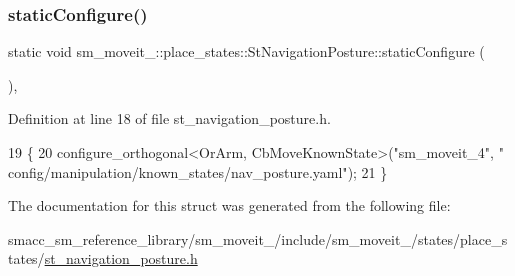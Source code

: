 \subsubsection{\texorpdfstring{static\+Configure()}{staticConfigure()}}
{\footnotesize\ttfamily static void sm\+\_\+moveit\+\_\+::place\+\_\+states\+::\+St\+Navigation\+Posture\+::static\+Configure (\begin{DoxyParamCaption}{ }\end{DoxyParamCaption})\hspace{0.3cm}{\ttfamily [inline]}, {\ttfamily [static]}}



Definition at line 18 of file st\+\_\+navigation\+\_\+posture.\+h.


\begin{DoxyCode}
19             \{
20                 configure\_orthogonal<OrArm, CbMoveKnownState>(\textcolor{stringliteral}{"sm\_moveit\_4"}, \textcolor{stringliteral}{"
      config/manipulation/known\_states/nav\_posture.yaml"});
21             \}
\end{DoxyCode}


The documentation for this struct was generated from the following file\+:\begin{DoxyCompactItemize}
\item 
smacc\+\_\+sm\+\_\+reference\+\_\+library/sm\+\_\+moveit\+\_/include/sm\+\_\+moveit\+\_/states/place\+\_\+states/\hyperlink{4_2include_2sm__moveit__4_2states_2place__states_2st__navigation__posture_8h}{st\+\_\+navigation\+\_\+posture.\+h}\end{DoxyCompactItemize}
